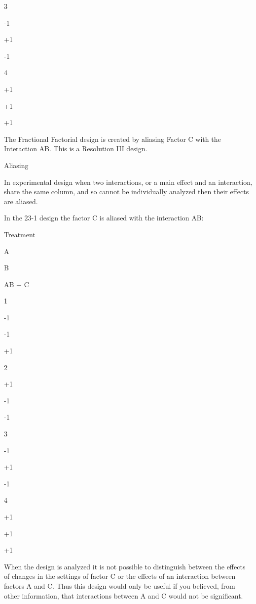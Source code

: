 3
 

-1
 

+1
 

-1
 



4
 

+1
 

+1
 

+1
 




The Fractional Factorial design is created by aliasing Factor C with the Interaction AB. This is a Resolution III design.







Aliasing


In experimental design when two interactions, or a main effect and an interaction, share the same column, and so cannot be individually analyzed then their effects are aliased.

In the 23-1 design the factor C is aliased with the interaction AB:











Treatment
 

A
 

B
 

AB + C
 



1
 

-1
 

-1
 

+1
 



2
 

+1
 

-1
 

-1
 



3
 

-1
 

+1
 

-1
 



4
 

+1
 

+1
 

+1
 

When the design is analyzed it is not possible to distinguish between the effects of changes in the settings of factor C or the effects of an interaction between factors A and C. Thus this design would only be useful if you believed, from other information, that interactions between A and C would not be significant.


